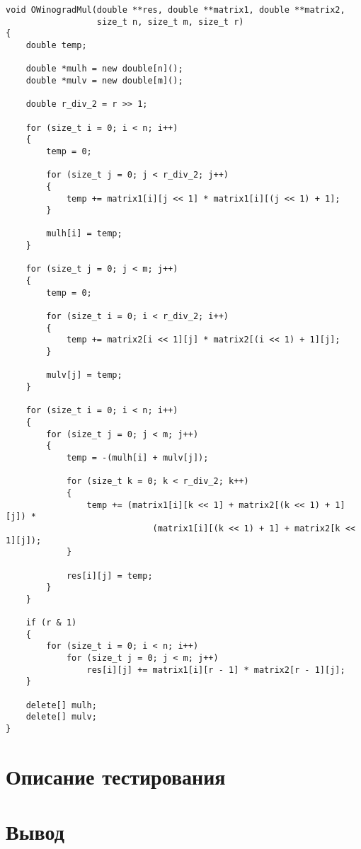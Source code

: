 \begin{lstlisting}[caption=Модифицированный аллгоритм Винограда]
void OWinogradMul(double **res, double **matrix1, double **matrix2,
                  size_t n, size_t m, size_t r)
{
    double temp;

    double *mulh = new double[n]();
    double *mulv = new double[m]();

    double r_div_2 = r >> 1;

    for (size_t i = 0; i < n; i++)
    {
        temp = 0;

        for (size_t j = 0; j < r_div_2; j++)
        {
            temp += matrix1[i][j << 1] * matrix1[i][(j << 1) + 1];
        }

        mulh[i] = temp;
    }

    for (size_t j = 0; j < m; j++)
    {
        temp = 0;

        for (size_t i = 0; i < r_div_2; i++)
        {
            temp += matrix2[i << 1][j] * matrix2[(i << 1) + 1][j];
        }

        mulv[j] = temp;
    }

    for (size_t i = 0; i < n; i++)
    {
        for (size_t j = 0; j < m; j++)
        {
            temp = -(mulh[i] + mulv[j]);

            for (size_t k = 0; k < r_div_2; k++)
            {
                temp += (matrix1[i][k << 1] + matrix2[(k << 1) + 1][j]) *
                             (matrix1[i][(k << 1) + 1] + matrix2[k << 1][j]);
            }

            res[i][j] = temp;
        }
    }

    if (r & 1)
    {
        for (size_t i = 0; i < n; i++)
            for (size_t j = 0; j < m; j++)
                res[i][j] += matrix1[i][r - 1] * matrix2[r - 1][j];
    }

    delete[] mulh;
    delete[] mulv;
}
\end{lstlisting}

\section{Описание тестирования}

\section{Вывод}

